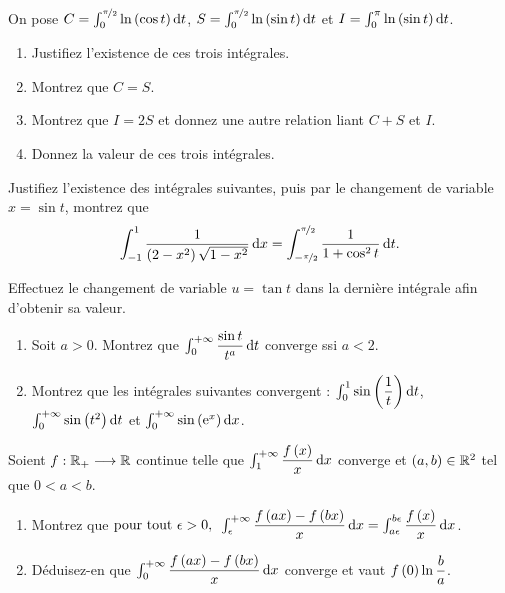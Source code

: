 \begin{exoss}~\\
On pose \(C=\int_0^{\nicefrac{\pi}{2}}\ln\paren{\cos t}\odif{t}\), \(S=\int_0^{\nicefrac{\pi}{2}}\ln\paren{\sin t}\odif{t}\) et \(I=\int_0^\pi\ln\paren{\sin t}\odif{t}\).

\begin{enumerate}
    \item Justifiez l'existence de ces trois intégrales. \\
    \item Montrez que \(C=S\). \\
    \item Montrez que \(I=2S\) et donnez une autre relation liant \(C+S\) et \(I\). \\
    \item Donnez la valeur de ces trois intégrales.
\end{enumerate}
\end{exoss}

\begin{exoss}
Justifiez l'existence des intégrales suivantes, puis par le changement de variable \(x=\sin t\), montrez que \[\int_{-1}^1\dfrac{1}{\paren{2-x^2}\sqrt{1-x^2}}\odif{x}=\int_{-\nicefrac{\pi}{2}}^{\nicefrac{\pi}{2}}\dfrac{1}{1+\cos^2t}\odif{t}.\]

Effectuez le changement de variable \(u=\tan t\) dans la dernière intégrale afin d'obtenir sa valeur.
\end{exoss}

\begin{exoss}
\begin{enumerate}
    \item Soit \(a>0\). Montrez que \(\int_0^{\pinf}\dfrac{\sin t}{t^a}\odif{t}\) converge ssi \(a<2\). \\
    \item Montrez que les intégrales suivantes convergent : \(\int_0^1\sin\paren{\dfrac{1}{t}}\odif{t}\), \(\int_0^{\pinf}\sin\paren{t^2}\odif{t}\) et \(\int_0^{\pinf}\sin\paren{\e{x}}\odif{x}\).
\end{enumerate}
\end{exoss}

\begin{exoss}
Soient \(f:\mathbb{R}_+\longrightarrow\mathbb{R}\) continue telle que \(\int_1^{\pinf}\dfrac{f\paren{x}}{x}\odif{x}\) converge et \(\left(a,b\right)\in\mathbb{R}^2\) tel que \(0<a<b\).

\begin{enumerate}
    \item Montrez que \(\quantifs{\tpt\epsilon>0}\int_\epsilon^{\pinf}\dfrac{f\paren{ax}-f\paren{bx}}{x}\odif{x}=\int_{a\epsilon}^{b\epsilon}\dfrac{f\paren{x}}{x}\odif{x}\). \\
    \item Déduisez-en que \(\int_0^{\pinf}\dfrac{f\paren{ax}-f\paren{bx}}{x}\odif{x}\) converge et vaut \(f\left(0\right)\ln\dfrac{b}{a}\).
\end{enumerate}
\end{exoss}


